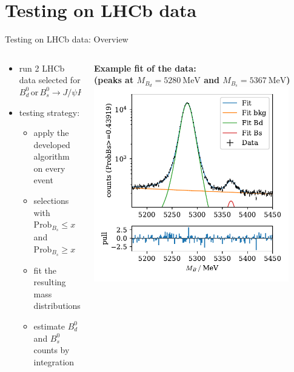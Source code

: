 \documentclass[aspectratio=1610, 10pt]{beamer}
\begin{document}
\section*{Testing on LHCb data}

\begin{frame}{Testing on LHCb data: Overview}
  \begin{columns}
    \begin{column}{0.5\textwidth}
      \begin{itemize}
        \item run 2 LHCb data selected for $B^0_d \, \text{or} \, B^0_s \rightarrow J/\psi K^0_S$
        \item testing strategy:
        \begin{itemize}
          \item apply the developed algorithm on every event
          \item selections with $\text{Prob}_{B_s} \leq x$ and $\text{Prob}_{B_s} \geq x$
          \item fit the resulting mass distributions
          \item estimate $B^0_d$ and $B^0_s$ counts by integration
        \end{itemize}
      \end{itemize}
    \end{column}
    \pause
    \begin{column}{0.5\textwidth}
      \centering
      \textbf{Example fit of the data:\\(peaks at $M_{B_d} = \qty{5280}{\MeV}$ and $M_{B_s} = \qty{5367}{\MeV}$)}
      \includegraphics[width=0.9\textwidth]{images/fit_example.pdf}
    \end{column}
  \end{columns}  
\end{frame}
\end{document}
